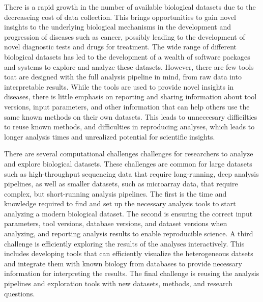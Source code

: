 There is a rapid growth in the number of available biological datasets due to
the decreaseing cost of data collection. This brings opportunities to gain novel
insights to the underlying biological mechanisms in the development and
progression of diseases such as cancer, possibly leading to the development of
novel diagnostic tests and drugs for treatment.  The wide range of different
biological datasets has led to the development of a wealth of software packages
and systems to explore and analyze these datasets.  However, there are few tools
toat are designed with the full analysis pipeline in mind, from raw data into
interpretable results. While the tools are used to provide novel insights in
diseases, there is little emphasis on reporting and sharing information about
tool versions, input parameters, and other information that can help others use
the same known methods on their own datasets.  This leads to unneccesary
difficilties to reuse known methods, and difficulties in reproducing analyses,
which leads to longer analysis times and unrealized potential for scientific
insights.

There are several computational challenges challenges for researchers to analyze
and explore biological datasets. These challenges are common for large datasets
such as high-throughput sequencing data that require long-running, deep analysis
pipelines, as well as smaller datasets, such as microarray data, that require
complex, but short-running analysis pipelines. The first is the time and
knowledge required to find and set up the necessary analysis tools to start
analyzing a modern biological dataset. The second is ensuring the correct input
parameters, tool versions, database versions, and dataset versions when
analyzing, and reporting analysis results to enable reproducible science. A
third challenge is efficiently exploring the results of the analyses
interactively. This includes developing tools that can efficiently visualize the
heterogeneous datsets and integrate them with known biology from databases to
provide necessary information for interpreting the results.  The final challenge
is reusing the analysis pipelines and exploration tools with new datasets,
methods, and research questions. 


